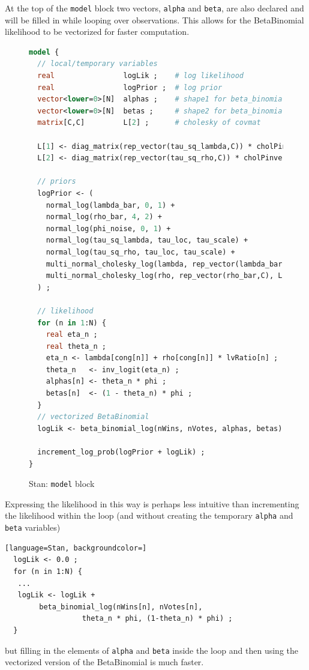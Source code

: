 At the top of the {\tt model} block two vectors, {\tt alpha} and {\tt beta}, are also declared and will be filled in while looping over observations. This allows for the BetaBinomial likelihood to be vectorized for faster computation.

\begin{figure}
\begin{lstlisting}[language=Stan, frame=trBL]
model {
  // local/temporary variables
  real                logLik ;    # log likelihood
  real                logPrior ;  # log prior
  vector<lower=0>[N]  alphas ;    # shape1 for beta_binomial 
  vector<lower=0>[N]  betas ;     # shape2 for beta_binomial
  matrix[C,C]         L[2] ;      # cholesky of covmat
  
  L[1] <- diag_matrix(rep_vector(tau_sq_lambda,C)) * cholPinverse ;
  L[2] <- diag_matrix(rep_vector(tau_sq_rho,C)) * cholPinverse ;
  
  // priors
  logPrior <- (
    normal_log(lambda_bar, 0, 1) + 
    normal_log(rho_bar, 4, 2) + 
    normal_log(phi_noise, 0, 1) +
    normal_log(tau_sq_lambda, tau_loc, tau_scale) +
    normal_log(tau_sq_rho, tau_loc, tau_scale) +
    multi_normal_cholesky_log(lambda, rep_vector(lambda_bar,C), L[1]) +
    multi_normal_cholesky_log(rho, rep_vector(rho_bar,C), L[2]) 
  ) ;
  
  // likelihood
  for (n in 1:N) {
    real eta_n ;
    real theta_n ;
    eta_n <- lambda[cong[n]] + rho[cong[n]] * lvRatio[n] ;
    theta_n   <- inv_logit(eta_n) ;    
    alphas[n] <- theta_n * phi ;
    betas[n]  <- (1 - theta_n) * phi ;
  }
  // vectorized BetaBinomial
  logLik <- beta_binomial_log(nWins, nVotes, alphas, betas) ; 
  
  increment_log_prob(logPrior + logLik) ; 
}
\end{lstlisting}
\caption{Stan: {\tt model} block}
\label{stan_model}
\end{figure}
%
Expressing the likelihood in this way is perhaps less intuitive than incrementing the likelihood within the loop (and without creating the temporary {\tt alpha} and {\tt beta} variables)

\begin{lstlisting}[language=Stan, backgroundcolor=]
  logLik <- 0.0 ;
  for (n in 1:N) {
   ...
   logLik <- logLik +
   		beta_binomial_log(nWins[n], nVotes[n], 
   				  theta_n * phi, (1-theta_n) * phi) ;
  }
\end{lstlisting}
%
\noindent but filling in the elements of {\tt alpha} and {\tt beta} inside the loop and then using the vectorized version of the BetaBinomial is much faster. 

